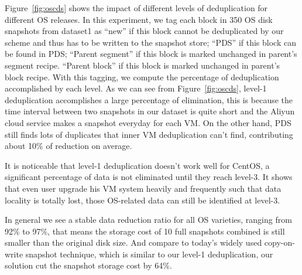 Figure~\ref{fig:oscds} shows the impact of different levels of deduplication for different OS releases.
In this experiment, we tag each block in 350 OS disk snapshots from dataset1 as  ``new''
if this block cannot be deduplicated by our scheme and thus has to be written to the snapshot store;
``PDS''  if this block can be found  in PDS;
``Parent segment'' if  this block is marked unchanged in parent's segment recipe.
``Parent block'' if  this block is marked unchanged in parent's block recipe.
With this tagging, we compute the percentage of deduplication accomplished by each level.
As we can see from Figure~\ref{fig:oscds}, level-1 deduplication accomplishes a large percentage of elimination,
this is because the time interval between two snapshots in our dataset
is quite short and the Aliyun cloud service makes a snapshot  everyday  for each VM.
On the other hand,  PDS still finds lots of duplicates that inner VM deduplication can't find,
contributing about 10\% of reduction on average.

It is noticeable that level-1 deduplication doesn't work well for CentOS, a significant percentage of data is not
eliminated until they reach level-3. It shows that even user upgrade his VM system heavily and frequently
such that data locality is totally lost, those OS-related data can still be identified at level-3. 

In general we see a stable data reduction ratio for all OS varieties, ranging from 92\% to 97\%, that means
the storage cost of 10 full snapshots combined is still smaller than the original disk size. And compare to 
today's widely used copy-on-write snapshot technique, which is similar to our level-1 deduplication, our
solution cut the snapshot storage cost by 64\%.




